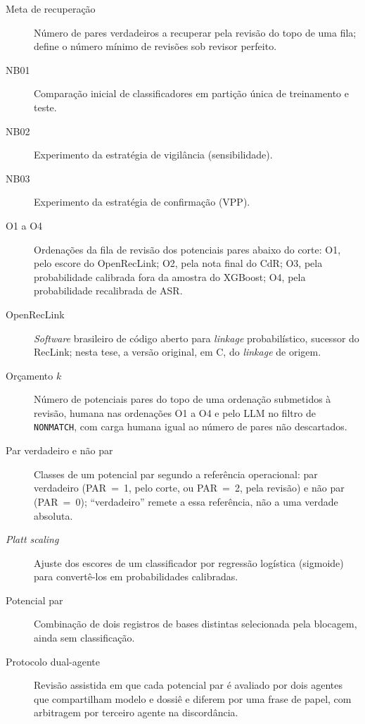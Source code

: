 \begin{description}
\item[Meta de recuperação] Número de pares verdadeiros a recuperar pela revisão do topo de uma fila; define o número mínimo de revisões sob revisor perfeito.

\item[NB01] Comparação inicial de classificadores em partição única de treinamento e teste.

\item[NB02] Experimento da estratégia de vigilância (sensibilidade).

\item[NB03] Experimento da estratégia de confirmação (VPP).

\item[O1 a O4] Ordenações da fila de revisão dos potenciais pares abaixo do corte: O1, pelo escore do OpenRecLink; O2, pela nota final do CdR; O3, pela probabilidade calibrada fora da amostra do XGBoost; O4, pela probabilidade recalibrada de ASR.

\item[OpenRecLink] \textit{Software} brasileiro de código aberto para \textit{linkage} probabilístico, sucessor do RecLink; nesta tese, a versão original, em C, do \textit{linkage} de origem.

\item[Orçamento $k$] Número de potenciais pares do topo de uma ordenação submetidos à revisão, humana nas ordenações O1 a O4 e pelo LLM no filtro de \texttt{NONMATCH}, com carga humana igual ao número de pares não descartados.

\item[Par verdadeiro e não par] Classes de um potencial par segundo a referência operacional: par verdadeiro (PAR~=~1, pelo corte, ou PAR~=~2, pela revisão) e não par (PAR~=~0); ``verdadeiro'' remete a essa referência, não a uma verdade absoluta.

\item[\textit{Platt scaling}] Ajuste dos escores de um classificador por regressão logística (sigmoide) para convertê-los em probabilidades calibradas.

\item[Potencial par] Combinação de dois registros de bases distintas selecionada pela blocagem, ainda sem classificação.

\item[Protocolo dual-agente] Revisão assistida em que cada potencial par é avaliado por dois agentes que compartilham modelo e dossiê e diferem por uma frase de papel, com arbitragem por terceiro agente na discordância.


\end{description}
